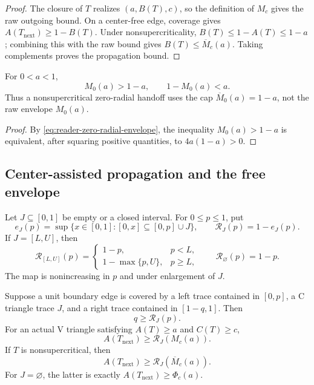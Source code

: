 \begin{proof}
The closure of $T$ realizes $(a,B(T),c)$, so the definition of $M_c$ gives
the raw outgoing bound. On a center-free edge, coverage gives
$A(T_{\mathrm{next}})\ge1-B(T)$. Under nonsupercriticality,
$B(T)\le1-A(T)\le1-a$; combining this with the raw bound gives
$B(T)\le\overline M_c(a)$. Taking complements proves the propagation bound.
\end{proof}

\begin{proposition}
\label{prop:reader-zero-radial-g}
For $0<a<1$,
\[
 M_0(a)>1-a,
 \qquad
 1-M_0(a)<a.
\]
Thus a nonsupercritical zero-radial handoff uses the cap
$\overline M_0(a)=1-a$, not the raw envelope $M_0(a)$.
\end{proposition}

\begin{proof}
By \eqref{eq:reader-zero-radial-envelope}, the inequality
$M_0(a)>1-a$ is equivalent, after squaring positive
quantities, to $4a(1-a)>0$.
\end{proof}

\subsection{Center-assisted propagation and the free envelope}

Let $J\subseteq[0,1]$ be empty or a closed interval.  For $0\le p\le1$, put
\begin{equation}
 e_J(p)=\sup\{x\in[0,1]:[0,x]\subseteq[0,p]\cup J\},
 \qquad
 \mathcal R_J(p)=1-e_J(p).
 \label{eq:reader-residual-operator}
\end{equation}
If $J=[L,U]$, then
\begin{equation}
 \mathcal R_{[L,U]}(p)=
 \begin{cases}
  1-p,&p<L,\\
  1-\max\{p,U\},&p\ge L,
 \end{cases}
 \qquad
 \mathcal R_\varnothing(p)=1-p.
 \label{eq:reader-residual-formula}
\end{equation}
The map is nonincreasing in $p$ and under enlargement of $J$.

\begin{lemma}
\label{lem:reader-generalized-handoff}
Suppose a unit boundary edge is covered by a left trace contained in $[0,p]$,
a C triangle trace $J$, and a right trace contained in $[1-q,1]$.  Then
\[
 q\ge\mathcal R_J(p).
\]
For an actual V triangle satisfying $A(T)\ge a$ and $C(T)\ge c$,
\begin{equation}
 A(T_{\mathrm{next}})\ge\mathcal R_J(M_c(a)).
 \label{eq:reader-generalized-raw-transfer}
\end{equation}
If $T$ is nonsupercritical, then
\begin{equation}
 A(T_{\mathrm{next}})\ge\mathcal R_J(\overline M_c(a)).
 \label{eq:reader-generalized-transfer}
\end{equation}
For $J=\varnothing$, the latter is exactly
$A(T_{\mathrm{next}})\ge\Phi_c(a)$.
\end{lemma}

